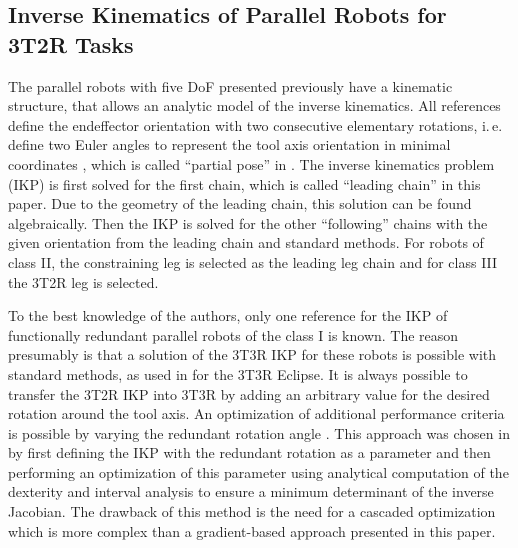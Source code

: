 \documentclass[robotics,article,submit,moreauthors,pdftex]{Definitions/mdpi}
\begin{document}
\subsection{Inverse Kinematics of Parallel Robots for 3T2R Tasks}

The parallel robots with five DoF presented previously have a kinematic structure, that allows an analytic model of the inverse kinematics.
All references define the endeffector orientation with two consecutive elementary rotations, i.\,e. define two Euler angles to represent the tool axis orientation in minimal coordinates \cite{LiuXuYaoXu2015, WenQinZhaLam2016, ZhengGaoZha2005,GaoSunZha2004, ChengWanZha2008, AlaghebandMahMilBen2015, Tale-MasoulehSaaGosTag2010, BaerWei2006, Tale-MasoulehGos2011}, which is called ``partial pose'' in \cite{MerletPerDan2000}.
The inverse kinematics problem (IKP) is first solved for the first chain, which is called ``leading chain'' in this paper.
Due to the geometry of the leading chain, this solution can be found algebraically. %
Then the IKP is solved for the other ``following'' chains with the given orientation from the leading chain and standard methods.
For robots of class II, the constraining leg is selected as the leading leg chain and for class III the 3T2R leg is selected. %

To the best knowledge of the authors, only one reference \cite{MerletPerDan2000} for the IKP of functionally redundant parallel robots of the class I is known.
The reason presumably is that a solution of the 3T3R IKP for these robots is possible with standard methods, as used in \cite{HongKim2000} for the 3T3R Eclipse.
It is always possible to transfer the 3T2R IKP into 3T3R by adding an arbitrary value for the desired rotation around the tool axis.
An optimization of additional performance criteria is possible by varying the redundant rotation angle \cite{ZhuQuCaoYan2013,GuoDonKe2015}.
This approach was chosen in \cite{MerletPerDan2000} by first defining the IKP with the redundant rotation as a parameter and then performing an optimization of this parameter using analytical computation of the dexterity and interval analysis to ensure a minimum determinant of the inverse Jacobian.
The drawback of this method is the need for a cascaded optimization which is more complex than a gradient-based approach presented in this paper.
\end{document}

